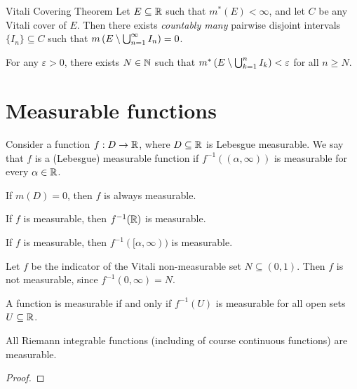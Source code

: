 \begin{thm}{Vitali Covering Theorem}\label{thm:vitali-covering}\proofbreak
    Let $E \subseteq \mathbb{R}$ such that $m^{*}(E) < \infty$, and let $C$ be any Vitali cover of $E$. Then there exists \emph{countably many} pairwise disjoint intervals $\{I_n\} \subseteq C$ such that $m\left(E\setminus \bigcup_{n=1}^{\infty}I_n\right) = 0$.
\end{thm}

\begin{cor}
    For any $\varepsilon > 0$, there exists $N \in \mathbb{N}$ such that $m^{*}\left(E\setminus \bigcup_{k=1}^{n}I_k\right) < \varepsilon$ for all $n \geq N$.
\end{cor}

\section{Measurable functions}

\begin{defn}
    Consider a function $f: D \to \mathbb{R}$, where $D \subseteq \mathbb{R}$ is Lebesgue measurable. We say that $f$ is a (Lebesgue) measurable function if $f^{-1}((\alpha, \infty))$ is measurable for every $\alpha \in \mathbb{R}$.
\end{defn}

\begin{exmp}
    If $m(D) = 0$, then $f$ is always measurable.

    If $f$ is measurable, then $f^{-1}(\mathbb{R})$ is measurable.

    If $f$ is measurable, then $f^{-1}([\alpha, \infty))$ is measurable.
\end{exmp}

\begin{exmp}
    Let $f$ be the indicator of the Vitali non-measurable set $N \subseteq (0, 1)$. Then $f$ is not measurable, since $f^{-1}(0, \infty) = N$.
\end{exmp}

\begin{thm}
    A function is measurable if and only if $f^{-1}(U)$ is measurable for all open sets $U \subseteq \mathbb{R}$.
\end{thm}

\begin{prop}
    All Riemann integrable functions (including of course continuous functions) are measurable.
\end{prop}

\begin{proof}
    
\end{proof}

